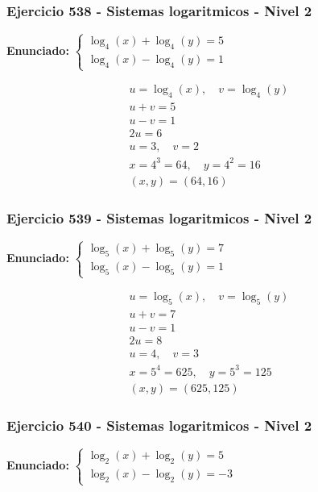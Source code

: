 \documentclass[12pt,a4paper]{article}
\begin{document}
\subsubsection*{Ejercicio 538 - Sistemas logaritmicos - Nivel 2}
\textbf{Enunciado:} \(\begin{cases} \log_{4}\left(x\right)+\log_{4}\left(y\right)=5\\ \log_{4}\left(x\right)-\log_{4}\left(y\right)=1\end{cases}\)

\[
\begin{aligned}
u=\log_{4}\left(x\right),\quad v=\log_{4}\left(y\right)\\
u+v=5\\
u-v=1\\
2u=6\\
u=3,\quad v=2\\
x=4^{3}=64,\quad y=4^{2}=16\\
\boxed{(x,y)=(64,16)}
\end{aligned}
\]


\subsubsection*{Ejercicio 539 - Sistemas logaritmicos - Nivel 2}
\textbf{Enunciado:} \(\begin{cases} \log_{5}\left(x\right)+\log_{5}\left(y\right)=7\\ \log_{5}\left(x\right)-\log_{5}\left(y\right)=1\end{cases}\)

\[
\begin{aligned}
u=\log_{5}\left(x\right),\quad v=\log_{5}\left(y\right)\\
u+v=7\\
u-v=1\\
2u=8\\
u=4,\quad v=3\\
x=5^{4}=625,\quad y=5^{3}=125\\
\boxed{(x,y)=(625,125)}
\end{aligned}
\]


\subsubsection*{Ejercicio 540 - Sistemas logaritmicos - Nivel 2}
\textbf{Enunciado:} \(\begin{cases} \log_{2}\left(x\right)+\log_{2}\left(y\right)=5\\ \log_{2}\left(x\right)-\log_{2}\left(y\right)=-3\end{cases}\)
\end{document}

